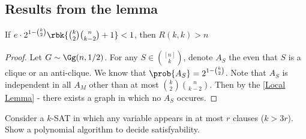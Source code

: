 \documentclass[a4paper, 11pt, oneside]{book}
\begin{document}
\subsection{Results from the lemma}
\begin{thm}
	 If $e\cdot 2^{1-{k\choose 2}}\rbk{{k\choose 2}{n\choose k-2} + 1}<1$, then $R(k,k) > n$
\end{thm}
\begin{proof}
	Let $G\sim \Gg(n,1/2)$. For any $S\in {[n]\choose k}$, denote $A_S$ the even that $S$ is a clique or an anti-clique. We know that $\prob{A_S} = 2^{1-{k\choose 2}}$. Note that $A_S$ is independent in all  $A_M$ other than at most $ {k\choose 2}{n\choose k-2}$. Then by the \autoref{Local Lemma} - there exists a graph in which no $A_S$ occures. 
\end{proof}
\begin{exercise}
Consider a $k$-SAT in which any variable appears in at most $r$ clauses ($k>3r$). Show a polynomial algorithm to decide satisfyability.
\end{exercise}
\end{document}
